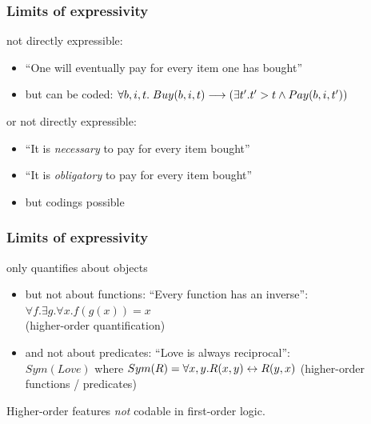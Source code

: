 \documentclass{beamer}
\begin{document}
\begin{frame}[fragile]\frametitle{Limits of expressivity}

   not directly expressible:
  \begin{itemize}
  \item ``One will eventually pay for every item one has bought''
  \item but can be coded: $\forall b, i, t.\; Buy(b, i, t) \longrightarrow (\exists t'. t'
    > t \wedge Pay(b, i, t'))$
  \end{itemize}

  \vspace{5mm}
   or  not directly expressible:
  \begin{itemize}
  \item ``It is \emph{necessary} to pay for every item bought''
  \item ``It is \emph{obligatory} to pay for every item bought''
  \item but codings possible
  \end{itemize}
  
\end{frame}

\begin{frame}[fragile]\frametitle{Limits of expressivity}

   only quantifies about objects
  \begin{itemize}
  \item but not about functions: ``Every function has an inverse'':\\
     $\forall f. \exists g. \forall x. f(g(x)) = x$\\
    (higher-order quantification)
  \item and not about predicates: ``Love is always reciprocal'':\\
     $Sym(Love)$ where $Sym(R) = \forall x, y. R(x, y) \leftrightarrow
    R(y, x)$
    (higher-order functions / predicates)
  \end{itemize}
  Higher-order features \emph{not} codable in first-order logic.
  
\end{frame}
\end{document}
